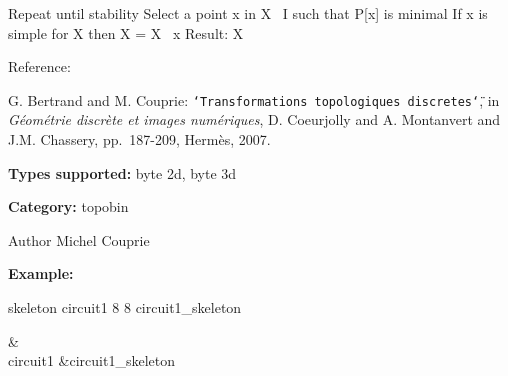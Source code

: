 \begin{DoxyVerb}
Repeat until stability
    Select a point x in X \ I such that P[x] is minimal
    If x is simple for X then
        X = X \ {x}
Result: X
\end{DoxyVerb}


Reference:\par
 [BC07] G. Bertrand and M. Couprie: {\tt \char`\"{}Transformations topologiques discretes\char`\"{}}, in {\itshape G\'{e}om\'{e}trie discr\`{e}te et images num\'{e}riques\/}, D. Coeurjolly and A. Montanvert and J.M. Chassery, pp.~187-\/209, Herm\`{e}s, 2007.\par
 {\bfseries Types supported:} byte 2d, byte 3d

{\bfseries Category:} topobin

\begin{DoxyAuthor}{Author}
Michel Couprie
\end{DoxyAuthor}
{\bfseries Example:}

skeleton circuit1 8 8 circuit1\_\-skeleton

\begin{TabularC}{2}
\hline
 &  \\
circuit1 &circuit1\_\-skeleton  \\
\end{TabularC}

